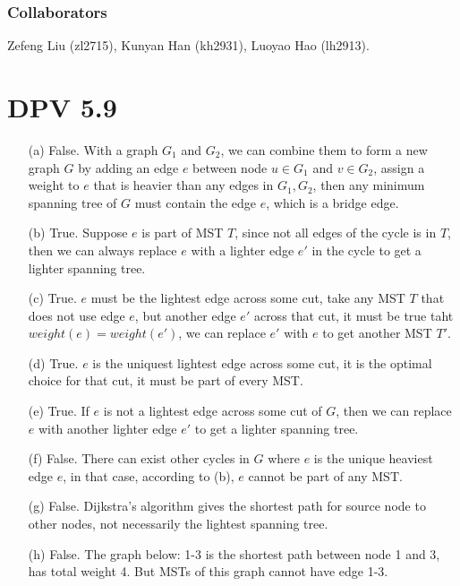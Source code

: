 \documentclass[twoside]{homework}
\begin{document}
\maketitle
\subsubsection*{Collaborators}
Zefeng Liu (zl2715), Kunyan Han (kh2931), Luoyao Hao (lh2913).

\section{DPV 5.9}
\begin{enumerate}
	\item [(a)] False. With a graph $G_1$ and $G_2$, we can combine them to form a new graph $G$ by adding an edge $e$ between node $u \in G_1$ and $v \in G_2$, assign a weight to $e$ that is heavier than any edges in $G_1, G_2$, then any minimum spanning tree of $G$ must contain the edge $e$, which is a bridge edge.
	\item [(b)] True. Suppose $e$ is part of MST $T$, since not all edges of the cycle is in $T$, then we can always replace $e$ with a lighter edge $e'$ in the cycle to get a lighter spanning tree.
	\item [(c)] True. $e$ must be the lightest edge across some cut, take any MST $T$ that does not use edge $e$, but another edge $e'$ across that cut, it must be true taht $weight(e) = weight(e')$, we can replace $e'$ with $e$ to get another MST $T'$.
	\item [(d)] True. $e$ is the uniquest lightest edge across some cut, it is the optimal choice for that cut, it must be part of every MST.
	\item [(e)] True. If $e$ is not a lightest edge across some cut of $G$, then we can replace $e$ with another lighter edge $e'$ to get a lighter spanning tree.
	\item [(f)] False. There can exist other cycles in $G$ where $e$ is the unique heaviest edge $e$, in that case, according to (b), $e$ cannot be part of any MST.
	\item [(g)] False. Dijkstra's algorithm gives the shortest path for source node to other nodes, not necessarily the lightest spanning tree.
	\item [(h)] False. The graph below: 1-3 is the shortest path between node 1 and 3, has total weight 4. But MSTs of this graph cannot have edge 1-3.

\end{enumerate}
\end{document}
